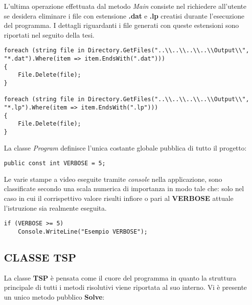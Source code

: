 \documentclass[11pt]{article}
\begin{document}
L'ultima operazione effettuata dal metodo \textit{Main} consiste nel richiedere all'utente se desidera eliminare i file con estensione \textbf{.dat} e \textbf{.lp} creatisi durante l'esecuzione del programma. I dettagli riguardanti i file generati con queste estensioni sono riportati nel seguito della tesi.

\begin{lstlisting}
foreach (string file in Directory.GetFiles("..\\..\\..\\..\\Output\\", "*.dat").Where(item => item.EndsWith(".dat")))
{
    File.Delete(file);
}

foreach (string file in Directory.GetFiles("..\\..\\..\\..\\Output\\", "*.lp").Where(item => item.EndsWith(".lp")))
{
    File.Delete(file);
}
\end{lstlisting}

La classe \textit{Program} definisce l'unica costante globale pubblica di tutto il progetto:

\begin{lstlisting}
public const int VERBOSE = 5;
\end{lstlisting}

Le varie stampe a video eseguite tramite \textit{console} nella applicazione, sono classificate secondo una scala numerica di importanza in modo tale che: solo nel caso in cui il corrispettivo valore risulti infiore o pari al \textbf{VERBOSE} attuale l'istruzione sia realmente eseguita.

\begin{lstlisting}
if (VERBOSE >= 5)
    Console.WriteLine("Esempio VERBOSE");
\end{lstlisting}

\subsection*{CLASSE TSP}
\label{sec:ClasseTSPS}

La classe \textbf{TSP} è pensata come il cuore del programma in quanto la struttura principale di tutti i metodi risolutivi viene riportata al suo interno. Vi è presente un unico metodo pubblico \textbf{Solve}:
\end{document}
